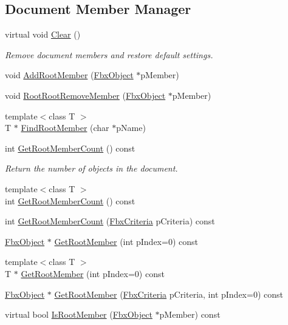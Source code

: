 \subsection*{Document Member Manager}
\begin{DoxyCompactItemize}
\item 
virtual void \hyperlink{class_fbx_document_ac8fa73e98a73c4f6637466e58d069bbe}{Clear} ()
\begin{DoxyCompactList}\small\item\em Remove document members and restore default settings. \end{DoxyCompactList}\item 
void \hyperlink{class_fbx_document_a61a00187fc94a643db607720d336ffc8}{Add\+Root\+Member} (\hyperlink{class_fbx_object}{Fbx\+Object} $\ast$p\+Member)
\item 
void \hyperlink{class_fbx_document_a7c1703bc0964a016615abf97baf0bc2c}{Root\+Root\+Remove\+Member} (\hyperlink{class_fbx_object}{Fbx\+Object} $\ast$p\+Member)
\item 
{\footnotesize template$<$class T $>$ }\\T $\ast$ \hyperlink{class_fbx_document_a0bbbf150471a9166a598a01fbd535894}{Find\+Root\+Member} (char $\ast$p\+Name)
\item 
int \hyperlink{class_fbx_document_a2fdc38f71ba7db1271c9372e1b3704ec}{Get\+Root\+Member\+Count} () const
\begin{DoxyCompactList}\small\item\em Return the number of objects in the document. \end{DoxyCompactList}\item 
{\footnotesize template$<$class T $>$ }\\int \hyperlink{class_fbx_document_a947d3939526793022b921298efae1660}{Get\+Root\+Member\+Count} () const
\item 
int \hyperlink{class_fbx_document_a9befeca0b093870eb1df0b5dbe23fc0a}{Get\+Root\+Member\+Count} (\hyperlink{class_fbx_criteria}{Fbx\+Criteria} p\+Criteria) const
\item 
\hyperlink{class_fbx_object}{Fbx\+Object} $\ast$ \hyperlink{class_fbx_document_a8616a424167ea7fe62239afbacb2afa0}{Get\+Root\+Member} (int p\+Index=0) const
\item 
{\footnotesize template$<$class T $>$ }\\T $\ast$ \hyperlink{class_fbx_document_a47286996a0ae5e3e86d561e155f5f37b}{Get\+Root\+Member} (int p\+Index=0) const
\item 
\hyperlink{class_fbx_object}{Fbx\+Object} $\ast$ \hyperlink{class_fbx_document_a7d851d995f21549ff38989289e583086}{Get\+Root\+Member} (\hyperlink{class_fbx_criteria}{Fbx\+Criteria} p\+Criteria, int p\+Index=0) const
\item 
virtual bool \hyperlink{class_fbx_document_ad20c1fe26a675684facd0f0d79de4b2a}{Is\+Root\+Member} (\hyperlink{class_fbx_object}{Fbx\+Object} $\ast$p\+Member) const
\end{DoxyCompactItemize}
